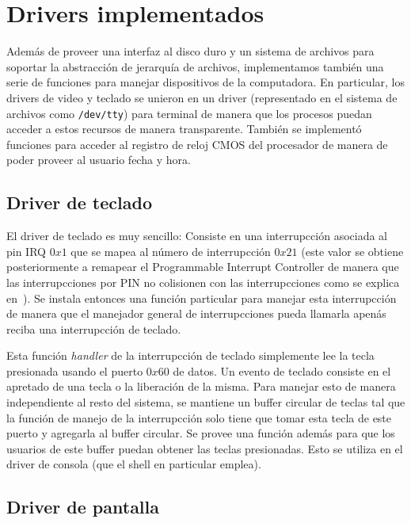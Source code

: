 \section{Drivers implementados}
\label{sec::drivers}

Adem\'as de proveer una interfaz al disco duro y un sistema de archivos para soportar
la abstracci\'on de jerarqu\'ia de archivos, implementamos tambi\'en una serie de funciones
para manejar dispositivos de la computadora. En particular, los drivers de video y teclado
se unieron en un driver (representado en el sistema de archivos como \texttt{/dev/tty}) para
terminal de manera que los procesos puedan acceder a estos recursos de manera transparente.
Tambi\'en se implement\'o funciones para acceder al registro de reloj CMOS del procesador de
manera de poder proveer al usuario fecha y hora.

\subsection{Driver de teclado}

El driver de teclado es muy sencillo: Consiste en una interrupcci\'on asociada al pin IRQ
$0x1$ que se mapea al n\'umero de interrupcci\'on $0x21$ 
(este valor se obtiene posteriormente a remapear el Programmable Interrupt Controller de manera
que las interrupcciones por PIN no colisionen con las interrupcciones como se explica en~\cite{jamesmolloy}).
Se instala entonces una funci\'on particular para manejar esta interrupcci\'on de manera que el manejador
general de interrupcciones pueda llamarla apen\'as reciba una interrupcci\'on de teclado.

Esta funci\'on \textit{handler} de la interrupcci\'on de teclado simplemente lee la tecla presionada usando
el puerto $0x60$ de datos. Un evento de teclado consiste en el apretado de una tecla o la liberaci\'on de la
misma. Para manejar esto de manera independiente al resto del sistema, se mantiene un buffer circular de teclas
tal que la funci\'on de manejo de la interrupcci\'on solo tiene que tomar esta tecla de este puerto y agregarla
al buffer circular. Se provee una funci\'on adem\'as para que los usuarios de este buffer puedan obtener las teclas
presionadas. Esto se utiliza en el driver de consola (que el shell en particular emplea).

\subsection{Driver de pantalla}

